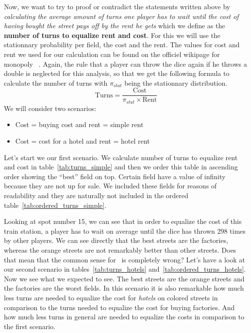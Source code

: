 Now, we want to try to proof or contradict the statements written above by \emph{calculating the average 
amount of turns one player has to wait until the cost of having bought the street pays off by the rent he 
gets} which we define as the \textbf{number of turns to equalize rent and cost}. For this we will use the stationnary probability per field, the cost and the rent. 
The values for cost and rent we used for our calculation can be found on the officiel wikipage for monopoly 
~\cite{wiki:monopolyRules}. Again, the rule 
that a player can throw the dice again if he throws a double is neglected for this analysis, so that we get 
the following formula to calculate the number of turns with $\pi_{stat}$ being the stationnary distribution.
\[
\text{Turns} = \frac{\text{Cost}}{\pi_{stat} \times \text{Rent}}
\]
We will consider two scenarios:
\begin{itemize}
	\item Cost = buying cost and rent = simple rent
	\item Cost = cost for a hotel and rent = hotel rent
\end{itemize}

Let's start we our first scenario.
We calculate number of turns to equalize rent and cost in table~\ref{tab:turns_simple} 
and then we order this table in ascending order showing the ``best'' field on top. 
Certain field have a value of infinity because they are not up for sale. We included these fields for 
reasons of readability and they are naturally not included in
the ordered table~\ref{tab:ordered_turns_simple}.

Looking at spot number 15, we can see that in order to equalize the cost of this train station, a player 
has to wait on average until the dice has thrown 298 times by other players.
We can see directly that the best streets are the factories, whereas the orange streets are not remarkably 
better than other streets. Does that mean that the common sense for \monopoly~is completely wrong?
Let's have a look at our second scenario in tables~\ref{tab:turns_hotels} and~\ref{tab:ordered_turns_hotels}.
Now we see what we expected to see. The best streets are the orange streets and the factories are the worst 
fields. In this scenario it is also remarkable how much less turns are needed to equalize the cost for 
\emph{hotels} on colored streets in comparison to the turns needed to equalize the cost for buying factories. And 
how much less turns in general are needed to equalize the costs in comparison to the first scenario.

